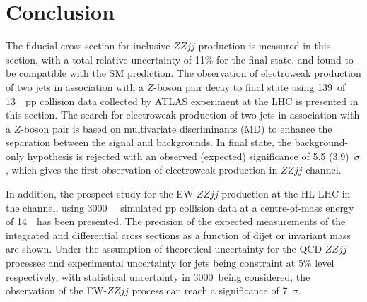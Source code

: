 \section{Conclusion}

The fiducial cross section for inclusive $ZZjj$ production is measured in this section, with a total relative uncertainty of 11\% for the \llll final state,
and found to be compatible with the SM prediction.
The observation of electroweak production of two jets in association with a $Z$-boson pair decay to \llll final state 
using 139~\ifb of 13~\tev~pp collision data collected by ATLAS experiment at the LHC is presented in this section.
The search for electroweak production of two jets in association with a $Z$-boson pair is based on multivariate discriminants (MD) to enhance the separation between the signal and backgrounds.
In \llll final state, the background-only hypothesis is rejected with an observed (expected) significance of 5.5 (3.9)~$\sigma$,
which gives the first observation of electroweak production in $ZZjj$ channel.

In addition, the prospect study for the EW-$ZZjj$ production at the HL-LHC in the \llll channel, using 3000~\ifb~ simulated pp collision data at a centre-of-mass energy of 14~\tev~has been presented.
The precision of the expected measurements of the integrated and differential cross sections as a function of dijet or \llll invariant mass are shown.
Under the assumption of theoretical uncertainty for the QCD-$ZZjj$ processes 
and experimental uncertainty for jets being constraint at 5\% level respectively, 
with statistical uncertainty in 3000~\ifb being considered, 
the observation of the EW-$ZZjj$ process can reach a significance of 7~$\sigma$.
